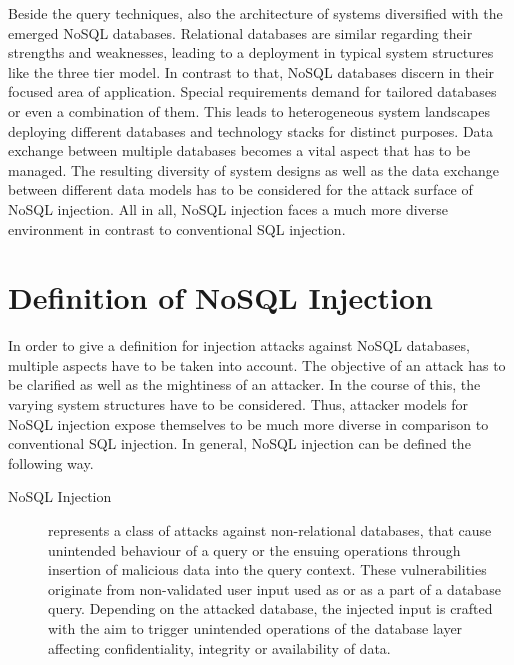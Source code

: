Beside the query techniques, also the architecture of systems diversified with the emerged NoSQL databases. Relational databases are similar regarding their strengths and weaknesses, leading to a deployment in typical system structures like the three tier model. In contrast to that, NoSQL databases discern in their focused area of application. Special requirements demand for tailored databases or even a combination of them. This leads to heterogeneous system landscapes deploying different databases and technology stacks for distinct purposes. Data exchange between multiple databases becomes a vital aspect that has to be managed. The resulting diversity of system designs as well as the data exchange between different data models has to be considered for the attack surface of NoSQL injection. All in all, NoSQL injection faces a much more diverse environment in contrast to conventional SQL injection.

\section{Definition of NoSQL Injection}
In order to give a definition for injection attacks against NoSQL databases, multiple aspects have to be taken into account. The objective of an attack has to be clarified as well as the mightiness of an attacker. In the course of this, the varying system structures have to be considered. Thus, attacker models for NoSQL injection expose themselves to be much more diverse in comparison to conventional SQL injection. In general, NoSQL injection can be defined the following way.\\

\begin{description}
\item [NoSQL Injection] represents a class of attacks against non-relational databases, that cause unintended behaviour of a query or the ensuing operations through insertion of malicious data into the query context. These vulnerabilities originate from non-validated user input used as or as a part of a database query. Depending on the attacked database, the injected input is crafted with the aim to trigger unintended operations of the database layer affecting confidentiality, integrity or availability of data.
\end{description}

